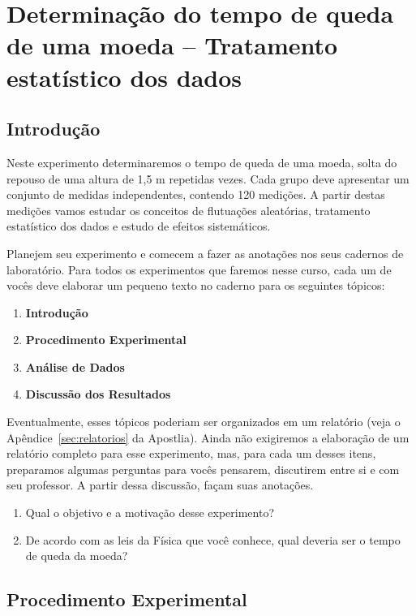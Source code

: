 
\chapter{Determinação do tempo de queda de uma moeda  -- Tratamento estatístico dos dados}
\label{chap:tempoqueda}
\vspace{-0.7cm}

\section{Introdução}

Neste experimento determinaremos o tempo de queda de uma moeda, solta do repouso de uma altura de 1,5 m repetidas vezes. Cada grupo deve apresentar um conjunto de medidas independentes, contendo 120 medições. A partir destas medições vamos estudar os conceitos de flutuações aleatórias, tratamento estatístico dos dados e estudo de efeitos sistemáticos. 

Planejem seu experimento e comecem a fazer as anotações nos seus cadernos de laboratório. Para todos os experimentos que faremos nesse curso, cada um de vocês deve elaborar um pequeno texto no caderno para os seguintes tópicos: 

\begin{enumerate}
\item {\bf Introdução }
\item {\bf Procedimento Experimental}
\item {\bf Análise de Dados}
\item {\bf Discussão dos Resultados}
\end{enumerate}

Eventualmente, esses tópicos poderiam ser organizados em um relatório (veja o Apêndice~\ref{sec:relatorios} da Apostlia). Ainda não exigiremos a elaboração de um relatório completo para esse experimento, mas, 
para cada um desses itens, preparamos algumas perguntas para vocês pensarem,  discutirem entre si e com seu professor. A partir dessa discussão, façam suas anotações. 

\begin{enumerate}
\item Qual o objetivo e a motivação desse experimento?
\item De acordo com as leis da Física que você conhece, qual deveria ser o tempo de queda da moeda? 
\end{enumerate}


\section{Procedimento Experimental}

